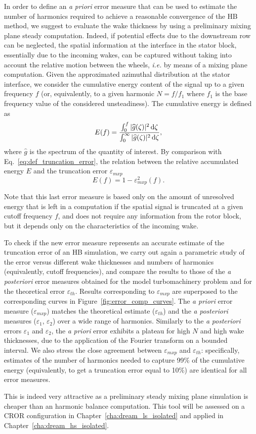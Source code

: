In order to define an \emph{a priori} error measure 
that can be used to estimate the number of 
harmonics required to achieve a reasonable 
convergence of the HB method, we suggest to 
evaluate the wake thickness by using a preliminary 
mixing plane steady computation. Indeed, if 
potential effects due to the downstream row can 
be neglected, the spatial information at the interface 
in the stator block, essentially due to the incoming 
wakes, can be captured without taking into account 
the relative motion between the wheels, \emph{i.e.} 
by means of a mixing plane computation. 
Given the approximated azimuthal distribution at 
the stator interface, we consider the cumulative
energy content of the signal up to a given frequency $f$ 
(or, equivalently, to a given harmonic $N=f/f_1$ where $f_1$ is the
base frequency value of the considered unsteadiness). 
The cumulative energy is defined as
\begin{equation}
    E(f) = \frac{
      \int_0^f | \widehat{g}(\zeta)|^2 \mathop{}\!\mathrm{d} \zeta
    }{
      \int_0^\infty | \widehat{g}(\zeta)|^2 \mathop{}\!\mathrm{d} \zeta
    },
\end{equation}
where $\widehat{g}$ is the spectrum of the quantity of interest.
By comparison with Eq.~\eqref{eq:def_truncation_error},
the relation between the relative accumulated energy $E$
and the truncation error $\varepsilon_{mxp}$
\begin{equation}
    E(f) = 1 - \varepsilon_{mxp}^2 (f).
    \label{eq:correspond_E_error}
\end{equation}


Note that this last error measure is based only on 
the amount of unresolved energy that is left 
in a computation if the spatial signal is 
truncated at a given cutoff frequency $f$, 
and does not require any information from the rotor
block, but it depends only on the characteristics 
of the incoming wake.

To check if the new error measure represents an 
accurate estimate of the truncation error of 
an HB simulation, we carry out again a 
parametric study of the error versus different 
wake thicknesses and numbers of harmonics 
(equivalently, cutoff frequencies), and compare 
the results to those of the \emph{a posteriori} error measures 
obtained for the model turbomachinery problem and for the 
theoretical error $\varepsilon_{th}$. 
Results corresponding to $\varepsilon_{mxp}$ are 
superposed to the corresponding curves in Figure~\ref{fig:error_comp_curves}. 
The \emph{a priori} error measure ($\varepsilon_{mxp}$) matches 
the theoretical estimate ($\varepsilon_{th}$)
and the \emph{a posteriori} measures ($\varepsilon_1$, $\varepsilon_2$)
over a wide range of harmonics. Similarly to the \emph{a posteriori}
errors $\varepsilon_1$ and $\varepsilon_2$, the \emph{a priori} error
exhibits a plateau for high $N$ and high wake thicknesses, 
due to the application of the Fourier transform on a bounded interval. 
We also stress the close agreement between 
$\varepsilon_{mxp}$ and $\varepsilon_{th}$: specifically, 
estimates of the number of harmonics needed to capture 99\% 
of the cumulative energy (equivalently, to get a 
truncation error equal to 10\%) are identical for 
all error measures.

This is indeed very attractive as a preliminary
steady mixing plane simulation is cheaper than
an harmonic balance computation. This tool
will be assessed on a CROR configuration in 
Chapter~\ref{cha:dream_ls_isolated} and applied
in Chapter~\ref{cha:dream_hs_isolated}.